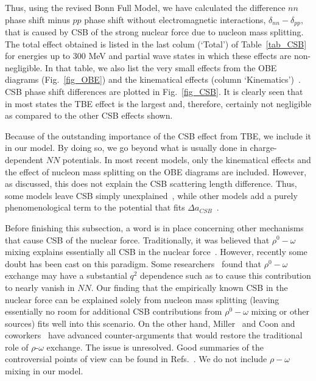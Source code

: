 Thus, using the revised Bonn Full Model, we have calculated
the difference $nn$ phase shift 
minus $pp$ phase shift without electromagnetic interactions,
$\delta_{nn}-\delta_{pp}$,
that is caused by CSB of the strong nuclear force
due to nucleon mass splitting. The total effect obtained
is listed in the last colum (`Total') of Table~\ref{tab_CSB}
for energies up to 300 MeV and partial wave states in which
these effects are non-negligible.
In that table, 
we also list the very small effects from the OBE diagrams
(Fig.~\ref{fig_OBE}) and the
kinematical effects (column `Kinematics')~\cite{foot1}.
CSB phase shift differences are plotted in Fig.~\ref{fig_CSB}.
It is clearly seen that in most states the TBE effect is the
largest and, therefore, certainly not negligible as compared to
the other CSB effects shown.

Because of the outstanding importance of the CSB effect from TBE, we include
it in our model. 
By doing so, we go beyond
what is usually done in charge-dependent $NN$ potentials.
In most recent models, only the kinematical effects and
the effect of nucleon mass splitting on the OBE diagrams
are included.
However, as discussed, this does not explain the
CSB scattering length difference. Thus, some models leave CSB
simply unexplained~\cite{Sto94}, while other models add a 
purely phenomenological term
to the potential that fits $\Delta a_{CSB}$~\cite{WSS95}.

Before finishing this subsection,
a word is in place concerning other mechanisms that cause
CSB of the nuclear force.
Traditionally, it was believed that 
$\rho^0-\omega$ 
mixing explains essentially all CSB in the nuclear force~\cite{MNS90}.
However, recently some doubt has been cast on this paradigm.
Some researchers~\cite{GHT92,PW93,KTW93,Con94} found that 
$\rho^0-\omega$ exchange may have a substantial
$q^2$ dependence such as to cause this contribution to nearly vanish
in $NN$.
Our finding that the empirically known CSB in the 
nuclear force can be explained solely from nucleon mass splitting 
(leaving essentially no room for additional CSB contributions 
from $\rho^0-\omega$ mixing or other sources) fits well into this 
scenario.
On the other hand, Miller~\cite{MO95} and Coon and coworkers~\cite{CMR97}
have advanced counter-arguments that would restore the traditional role
of $\rho$-$\omega$ exchange.
The issue is unresolved.
Good summaries of the controversial points of view can be found in
Refs.~\cite{MO95,Con97,CS00}.
We do not include $\rho-\omega$ mixing in our model.

